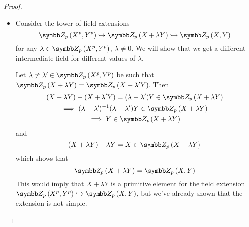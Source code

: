 \begin{proof}
\begin{itemize}
    \item Consider the tower of field extensions
    \[
        \adjoin[\integersmod{p}]{X^p, Y^p}
        \hookrightarrow
        \adjoin[\integersmod{p}]{X + \lambda Y} 
        \hookrightarrow
        \adjoin[\integersmod{p}]{X, Y}
    \]
    for any \(\lambda \in \adjoin[\integersmod{p}]{X^p, Y^p}\), \(\lambda \neq 0\). We will show that we get a different intermediate field for different values of \(\lambda\).

    Let \(\lambda \neq \lambda' \in \adjoin[\integersmod{p}]{X^p, Y^p}\) be such that \(\adjoin[\integersmod{p}]{X + \lambda Y} = \adjoin[\integersmod{p}]{X + \lambda' Y}\). Then
    \begin{gather*}
        (X + \lambda Y) - (X + \lambda' Y) = (\lambda - \lambda') Y \in \adjoin[\integersmod{p}]{X + \lambda Y} \\
        \implies (\lambda - \lambda')^{-1} (\lambda - \lambda') Y \in \adjoin[\integersmod{p}]{X + \lambda Y} \\
        \implies Y \in \adjoin[\integersmod{p}]{X + \lambda Y}
    \end{gather*}
    and
    \[
        (X + \lambda Y) - \lambda Y = X \in \adjoin[\integersmod{p}]{X + \lambda Y}
    \]
    which shows that
    \[
        \adjoin[\integersmod{p}]{X + \lambda Y} 
        =
        \adjoin[\integersmod{p}]{X, Y}
    \]
    This would imply that \(X + \lambda Y\) is a primitive element for the field extension \(\adjoin[\integersmod{p}]{X^p, Y^p} \hookrightarrow \adjoin[\integersmod{p}]{X, Y}\), but we've already shown that the extension is not simple.
\end{itemize}
\end{proof}

